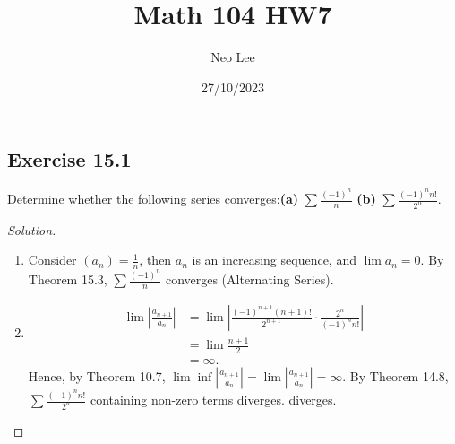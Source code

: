 \documentclass{article}
\title{Math 104 HW7}
\author{Neo Lee}
\date{27/10/2023}
\begin{document}
 

\maketitle 

\subsection*{Exercise 15.1}
Determine whether the following series converges:\qquad \textbf{(a)} $\sum \frac{(-1)^n}{n}$ 
\qquad \textbf{(b)} $\sum \frac{(-1)^nn!}{2^n}$.
\begin{proof}[Solution] \indent
    \begin{enumerate}[label=(\alph*)]
        \item 
        Consider $(a_n)=\frac{1}{n}$, then $a_n$ is an increasing sequence, and $\lim a_n=0$. By 
        Theorem 15.3, $\sum \frac{(-1)^n}{n}$ converges (Alternating Series).
        
        \item
        \begin{align*}
            \lim \left|\frac{a_{n+1}}{a_n}\right| & = \lim \left|\frac{(-1)^{n+1}(n+1)!}{2^{n+1}}\cdot
            \frac{2^n}{(-1)^nn!}\right| \\
            & = \lim \frac{n+1}{2} \\
            & = \infty.
        \end{align*}
        Hence, by Theorem 10.7, $\lim \inf \left|\frac{a_{n+1}}{a_n}\right| = 
        \lim \left|\frac{a_{n+1}}{a_n}\right| = \infty$. By Theorem 14.8, $\sum \frac{(-1)^nn!}{2^n}$
        containing non-zero terms diverges.
        diverges.
    \end{enumerate}
\end{proof}
\end{document}
